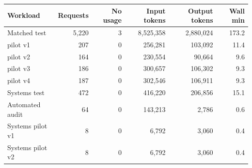 \begin{tabular}{lrrrrr}
\toprule
Workload & Requests & No usage & Input tokens & Output tokens & Wall min \\
\midrule
Matched test & 5,220 & 3 & 8,525,358 & 2,880,024 & 173.2 \\
pilot v1 & 207 & 0 & 256,281 & 103,092 & 11.4 \\
pilot v2 & 164 & 0 & 230,554 & 90,664 & 9.6 \\
pilot v3 & 186 & 0 & 300,657 & 106,302 & 9.3 \\
pilot v4 & 187 & 0 & 302,546 & 106,911 & 9.3 \\
Systems test & 472 & 0 & 416,220 & 206,856 & 15.1 \\
Automated audit & 64 & 0 & 143,213 & 2,786 & 0.6 \\
Systems pilot v1 & 8 & 0 & 6,792 & 3,060 & 0.4 \\
Systems pilot v2 & 8 & 0 & 6,792 & 3,060 & 0.4 \\
\bottomrule
\end{tabular}
